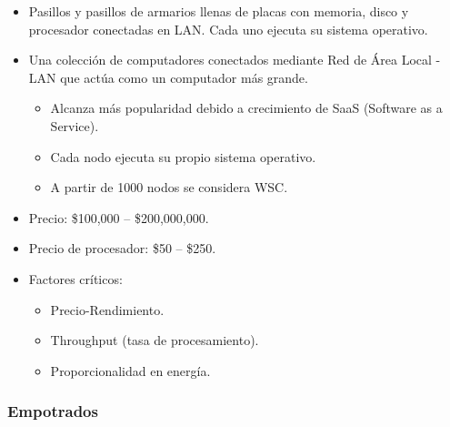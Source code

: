 \documentclass[12pt, twoside, openright]{report} %
\begin{document}
    \begin{itemize}
    
    \item
      Pasillos y pasillos de armarios llenas de placas con memoria,
      disco y procesador conectadas en LAN. Cada uno ejecuta su sistema
      operativo.
    \item
      Una colección de computadores conectados mediante Red de Área
      Local - LAN que actúa como un computador más grande.

      \begin{itemize}
      
      \item
        Alcanza más popularidad debido a crecimiento de SaaS (Software
        as a Service).
      \item
        Cada nodo ejecuta su propio sistema operativo.
      \item
        A partir de 1000 nodos se considera WSC.
      \end{itemize}
    \item
      Precio: \$100,000 -- \$200,000,000.
    \item
      Precio de procesador: \$50 -- \$250.
    \item
      Factores críticos:

      \begin{itemize}
      
      \item
        Precio-Rendimiento.
      \item
        Throughput (tasa de procesamiento).
      \item
        Proporcionalidad en energía.
      \end{itemize}
    \end{itemize}
    
    \subsubsection{Empotrados}
\end{document}
